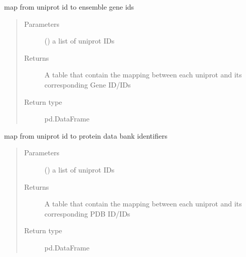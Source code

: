 \documentclass[letterpaper,10pt,english]{sphinxmanual}
\begin{document}
\begin{fulllineitems}
\label{\detokenize{IPTK.Utils:IPTK.Utils.Mapping.map_from_uniprot_gene}}
map from uniprot id to ensemble gene ids
\begin{quote}\begin{description}
\item[{Parameters}] \leavevmode
{} (\sphinxstyleliteralemphasis{\sphinxupquote{{[}}}\sphinxstyleliteralemphasis{\sphinxupquote{{]}}}) \textendash{} a list of uniprot IDs

\item[{Returns}] \leavevmode
A table that contain the mapping between each uniprot and its corresponding Gene ID/IDs

\item[{Return type}] \leavevmode
pd.DataFrame

\end{description}\end{quote}

\end{fulllineitems}


\begin{fulllineitems}
\label{\detokenize{IPTK.Utils:IPTK.Utils.Mapping.map_from_uniprot_pdb}}
map from uniprot id to protein data bank identifiers
\begin{quote}\begin{description}
\item[{Parameters}] \leavevmode
{} (\sphinxstyleliteralemphasis{\sphinxupquote{{[}}}\sphinxstyleliteralemphasis{\sphinxupquote{{]}}}) \textendash{} a list of uniprot IDs

\item[{Returns}] \leavevmode
A table that contain the mapping between each uniprot and its corresponding PDB ID/IDs

\item[{Return type}] \leavevmode
pd.DataFrame

\end{description}\end{quote}

\end{fulllineitems}
\end{document}
